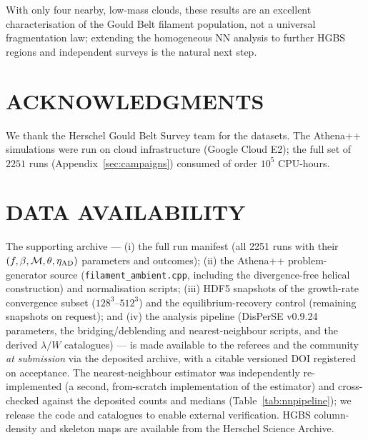 \documentclass[usenatbib,twoside,twocolumn]{mnras}
\begin{document}
\smallskip\noindent With only four nearby, low-mass clouds, these results are an excellent characterisation of the Gould Belt filament population, not a universal fragmentation law; extending the homogeneous NN analysis to further HGBS regions and independent surveys is the natural next step.

\section*{ACKNOWLEDGMENTS}

We thank the Herschel Gould Belt Survey team for the datasets. The Athena++ simulations were run on cloud infrastructure (Google Cloud E2); the full set of $2251$ runs (Appendix~\ref{sec:campaigns}) consumed of order $10^5$ CPU-hours.

\section*{DATA AVAILABILITY}

The supporting archive --- (i) the full run manifest (all 2251 runs with their $(f,\beta,\mathcal{M},\theta,\eta_{\rm AD})$ parameters and outcomes); (ii) the Athena++ problem-generator source (\texttt{filament\_ambient.cpp}, including the divergence-free helical construction) and normalisation scripts; (iii) HDF5 snapshots of the growth-rate convergence subset ($128^3$--$512^3$) and the equilibrium-recovery control (remaining snapshots on request); and (iv) the analysis pipeline (DisPerSE v0.9.24 parameters, the bridging/deblending and nearest-neighbour scripts, and the derived $\lambda/W$ catalogues) --- is made available to the referees and the community \emph{at submission} via the deposited archive, with a citable versioned DOI registered on acceptance. The nearest-neighbour estimator was independently re-implemented (a second, from-scratch implementation of the estimator) and cross-checked against the deposited counts and medians (Table~\ref{tab:nnpipeline}); we release the code and catalogues to enable external verification. HGBS column-density and skeleton maps are available from the Herschel Science Archive.


\appendix
\end{document}
